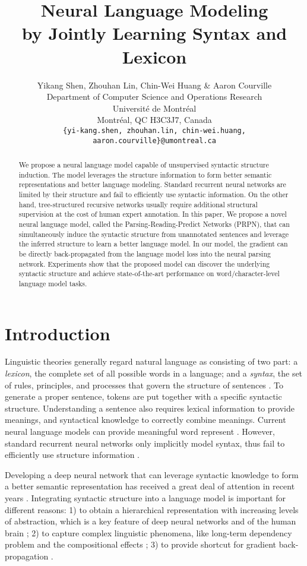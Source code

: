 \documentclass{article} \usepackage{iclr2018_conference,times}
\title{Neural Language Modeling \\ by Jointly Learning Syntax and Lexicon}
\author{Yikang Shen, Zhouhan Lin, Chin-Wei Huang \& Aaron Courville 
\\
Department of Computer Science and Operations Research \\
Université de Montréal \\
Montréal, QC H3C3J7, Canada \\
\texttt{\{yi-kang.shen, zhouhan.lin, chin-wei.huang, aaron.courville\}@umontreal.ca} \\
}
\begin{document}
\maketitle

\begin{abstract}
We propose a neural language model capable of unsupervised syntactic structure induction. The model leverages the structure information to form better semantic representations and better language modeling. Standard recurrent neural networks are limited by their structure and fail to efficiently use syntactic information. On the other hand, tree-structured recursive networks usually require additional structural supervision at the cost of human expert annotation. In this paper, We propose a novel neural language model, called the Parsing-Reading-Predict Networks (PRPN), that can simultaneously induce the syntactic structure from unannotated sentences and leverage the inferred structure to learn a better language model. In our model, the gradient can be directly back-propagated from the language model loss into the neural parsing network. Experiments show that the proposed model can discover the underlying syntactic structure and achieve state-of-the-art performance on word/character-level language model tasks.  
\end{abstract}

\section{Introduction}
Linguistic theories generally regard natural language as consisting of two part: a \emph{lexicon}, the complete set of all possible words in a language; and a \emph{syntax}, the set of rules, principles, and processes that govern the structure of sentences \citep{sandra1994morphological}. To generate a proper sentence, tokens are put together with a specific syntactic structure. Understanding a sentence also requires lexical information to provide meanings, and syntactical knowledge to correctly combine meanings. Current neural language models can provide meaningful word represent \citep{bengio2003neural, mikolov2013efficient, chen2013expressive}. However, standard recurrent neural networks only implicitly model syntax, thus fail to efficiently use structure information \citep{tai2015improved}. 


Developing a deep neural network that can leverage syntactic knowledge to form a better semantic representation has received a great deal of attention in recent years \citep{socher2013recursive, tai2015improved, chung2016hierarchical}. Integrating syntactic structure into a language model is important for different reasons: 1) to obtain a hierarchical representation with increasing levels of abstraction, which is a key feature of deep neural networks and of the human brain \citep{bengio2009learning, lecun2015deep, schmidhuber2015deep}; 2) to capture complex linguistic phenomena, like long-term dependency problem \citep{tai2015improved} and the compositional effects \citep{socher2013recursive}; 3) to provide shortcut for gradient back-propagation \citep{chung2016hierarchical}.
\end{document}
